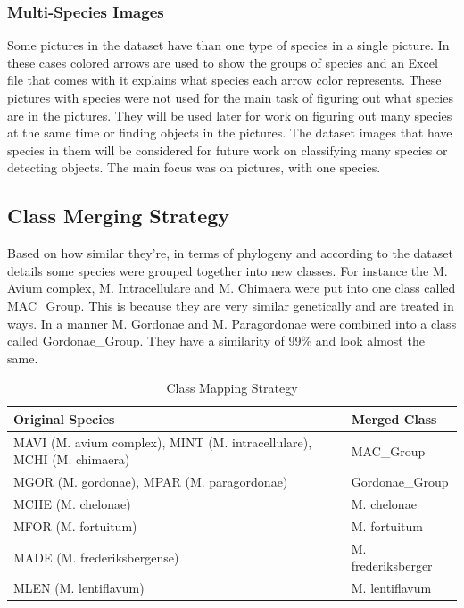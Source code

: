 \documentclass[journal,article,submit,pdftex,moreauthors]{Definitions/mdpi}
\begin{document}


\subsubsection{\textbf{Multi-Species Images}}

Some pictures in the dataset have than one type of species in a single picture. In these cases colored arrows are used to show the groups of species and an Excel file that comes with it explains what species each arrow color represents. These pictures with species were not used for the main task of figuring out what species are in the pictures. They will be used later for work on figuring out many species at the same time or finding objects in the pictures. The dataset images that have species in them will be considered for future work on classifying many species or detecting objects. The main focus was on pictures, with one species. 


\subsection{\textbf{Class Merging Strategy}}
 Based on how similar they're, in terms of phylogeny and according to the dataset details some species were grouped together into new classes. For instance the M. Avium complex, M. Intracellulare and M. Chimaera were put into one class called MAC\_Group. This is because they are very similar genetically and are treated in ways. In a manner M. Gordonae and M. Paragordonae were combined into a class called Gordonae\_Group. They have a similarity of 99\% and look almost the same.
 
 \begin{table}[h]
 	\centering
 	\caption{ Class Mapping Strategy}
 	\begin{tabular}{|p{6cm}|l|}
 		\hline
 		\textbf{Original Species} & \textbf{Merged Class} \\
 		\hline
 		MAVI (M. avium complex), MINT (M. intracellulare), MCHI (M. chimaera) & MAC\_Group \\
 		\hline
 		MGOR (M. gordonae), MPAR (M. paragordonae) & Gordonae\_Group \\
 		\hline
 		MCHE (M. chelonae) & M. chelonae \\
 		\hline
 		MFOR (M. fortuitum) & M. fortuitum \\
 		\hline
 		MADE (M. frederiksbergense) & M. frederiksberger \\
 		\hline
 		MLEN (M. lentiflavum) & M. lentiflavum \\
 		\hline
 	\end{tabular}
 	\label{tab:mapping}
 \end{table}
 
\end{document}
